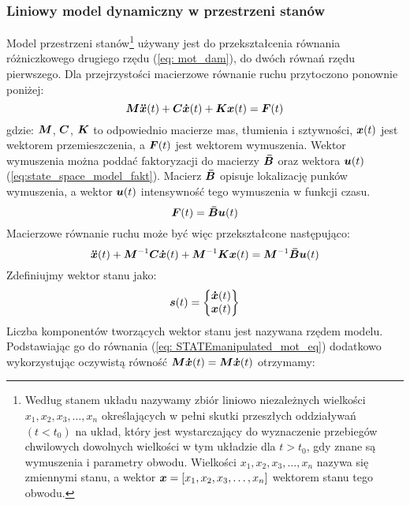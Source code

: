 \subsubsection{Liniowy model dynamiczny w przestrzeni stanów}
Model przestrzeni stanów\footnote{
	Według \cite{Kaczorek2016} stanem układu nazywamy zbiór liniowo niezależnych wielkości $x_1, x_2, x_3,\dots,x_n$ określających w pełni skutki przeszłych oddziaływań $(t<t_0)$ na układ, który jest wystarczający do wyznaczenie przebiegów chwilowych dowolnych wielkości w tym układzie dla $t>t_0$, gdy znane są wymuszenia i parametry obwodu. Wielkości $x_1, x_2, x_3,\dots,x_n$ nazywa się zmiennymi stanu, a wektor $\bm{x}=[x_1, x_2, x_3,\dots,x_n]$ wektorem stanu tego obwodu.
}  używany jest do przekształcenia równania różniczkowego drugiego rzędu (\ref{eq: mot_dam}), do dwóch równań rzędu pierwszego. Dla przejrzystości macierzowe równanie ruchu przytoczono ponownie poniżej:
\begin{equation}
	\bm{M} \bm{\ddot{x}}(t) +\bm{C} \bm{\dot{x}}(t)+ \bm{Kx}(t) = \bm{F}(t)
\end{equation}
gdzie: $\bm{M}$, $\bm{C}$, $\bm{K}$ to odpowiednio macierze mas, tłumienia i sztywności, $\bm{x}(t)$ jest wektorem przemieszczenia, a $\bm{F}(t)$ jest wektorem wymuszenia. 
Wektor wymuszenia można poddać faktoryzacji do macierzy $\bm{\bar{B}}$ oraz wektora $\bm{u}(t)$ (\ref{eq:state_space_model_fakt}). Macierz $\bm{\bar{B}}$ opisuje lokalizację punków wymuszenia, a wektor $\bm{u}(t)$ intensywność tego wymuszenia w funkcji czasu.
\begin{equation} \label{eq:state_space_model_fakt}
	\bm{F}(t) = \bm{\bar{B}}\bm{u}(t)
\end{equation} 
Macierzowe równanie ruchu może być więc przekształcone następująco:
\begin{equation} \label{eq: STATEmanipulated_mot_eq}
	\bm{\ddot{x}}(t) +\bm{M}^{-1} \bm{C} \bm{\dot{x}}(t)+ \bm{M}^{-1}\bm{Kx}(t) = \bm{M}^{-1}\bm{\bar{B}}\bm{u}(t)
\end{equation}
Zdefiniujmy wektor stanu jako:
\begin{equation} \label{eq: stateVector}
	\bm{s}(t) = \begin{Bmatrix}
		\bm{\dot{x}}(t) \\
		\bm{x}(t)
	\end{Bmatrix}
\end{equation}
Liczba komponentów tworzących wektor stanu jest nazywana rzędem modelu. Podstawiając go do równania (\ref{eq: STATEmanipulated_mot_eq}) dodatkowo wykorzystując oczywistą równość $\bm{M}\bm{\dot{x}}(t)=\bm{M}\bm{\dot{x}}(t)$ otrzymamy:
